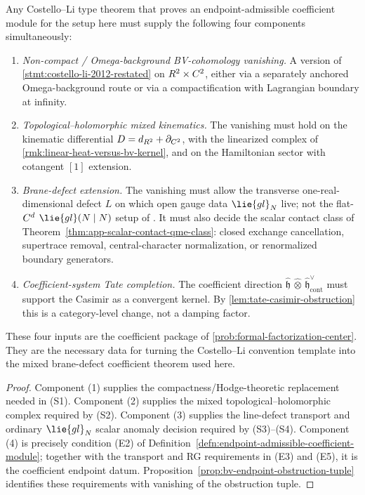 \begin{thm}\label{thm:t4-four-missing}
  Any Costello--Li type theorem that proves an endpoint-admissible
  coefficient module for the setup here must supply the following four
  components simultaneously:
  \begin{enumerate}
    \item \emph{Non-compact / Omega-background BV-cohomology
      vanishing.} A version of \ref{stmt:costello-li-2012-restated}
      on $R^2\times C^2$, either via a separately anchored
      Omega-background route or via a compactification with Lagrangian
      boundary at infinity.
    \item \emph{Topological--holomorphic mixed kinematics.} The
      vanishing must hold on the kinematic differential
      $D=d_{R^2}+\partial_{C^2}$, with the linearized
      complex of \ref{rmk:linear-heat-versus-bv-kernel}, and on
      the Hamiltonian sector with cotangent $[1]$ extension.
    \item \emph{Brane-defect extension.} The vanishing must allow
      the transverse one-real-dimensional defect \(L\) on
      which open gauge data $\lie{gl}_N$ live; not the flat-$C^d$
      $\lie{gl}(N\mid N)$ setup of
      \cite{costello-li-open-closed-bcov}. It must also decide the
      scalar contact class of
      Theorem~\ref{thm:app-scalar-contact-qme-class}: closed
      exchange cancellation, supertrace removal, central-character
      normalization, or renormalized boundary generators.
    \item \emph{Coefficient-system Tate completion.} The
      coefficient direction
      $\widehat{\mathfrak h}\,\widehat\otimes\,
      \widehat{\mathfrak h}^{\vee}_{\mathrm{cont}}$ must support the
      Casimir as a convergent kernel. By
      \ref{lem:tate-casimir-obstruction} this is a category-level
      change, not a damping factor.
  \end{enumerate}
  These four inputs are the coefficient package of
  \ref{prob:formal-factorization-center}.  They are the necessary data
  for turning the Costello--Li convention template into the mixed
  brane-defect coefficient theorem used here.
\end{thm}

\begin{proof}
  Component (1) supplies the compactness/Hodge-theoretic replacement
  needed in (S1).  Component (2) supplies the mixed
  topological--holomorphic complex required by (S2).  Component (3)
  supplies the line-defect transport and ordinary \(\lie{gl}_N\) scalar
  anomaly decision required by (S3)--(S4).  Component (4) is precisely
  condition (E2) of
  Definition~\ref{defn:endpoint-admissible-coefficient-module}; together
  with the transport and RG requirements in (E3) and (E5), it is the
  coefficient endpoint datum.  Proposition~\ref{prop:bv-endpoint-obstruction-tuple}
  identifies these requirements with vanishing of the obstruction tuple.
\end{proof}


